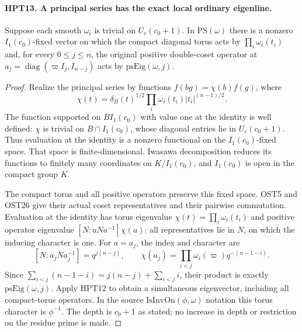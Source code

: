 \documentclass[11pt,a4paper]{article}
\numberwithin{equation}{section}
\theoremstyle{remark}\newtheorem{remark}[theorem]{Remark}
\begin{document}
\paragraph{HPT13. A principal series has the exact local ordinary eigenline.}
\label{claim:HPT13}
Suppose each smooth $\omega_i$ is trivial on $U_c(c_0+1)$.
In $\mathrm{PS}(\omega)$ there is a nonzero $I_1(c_0)$-fixed
vector on which the compact diagonal torus acts by
$\prod_i\omega_i(t_i)$ and, for every $0\leq j\leq n$,
the original positive double-coset operator at
$a_j=\operatorname{diag}(\varpi I_j,I_{n-j})$ acts by
$\mathrm{psEig}(\omega,j)$.
\begin{proof}
Realize the principal series by functions $f(bg)=\chi(b)f(g)$,
where
\[
       \chi(t)=\delta_B(t)^{1/2}\prod_i\omega_i(t_i)|t_i|^{(n-1)/2}.
\]
The function supported on $BI_1(c_0)$ with value one at the
identity is well defined: $\chi$ is trivial on $B\cap I_1(c_0)$,
whose diagonal entries lie in $U_c(c_0+1)$.  Thus evaluation at
the identity is a nonzero functional on the $I_1(c_0)$-fixed
space.  That space is finite-dimensional.  Iwasawa decomposition
reduces its functions to finitely many coordinates on
$K/I_1(c_0)$, and $I_1(c_0)$ is open in the compact group $K$.

The compact torus and all positive operators preserve this fixed
space.  OST5 and OST26 give their actual coset representatives
and their pairwise commutation.  Evaluation at the identity has
torus eigenvalue $\chi(t)=\prod_i\omega_i(t_i)$ and positive
operator eigenvalue $[N:aNa^{-1}]\chi(a)$: all representatives
lie in $N$, on which the inducing character is one.
For $a=a_j$, the index and character are
\[
 [N:a_jNa_j^{-1}]=q^{j(n-j)},\qquad
 \chi(a_j)=\prod_{i<j}\omega_i(\varpi)q^{-(n-1-i)}.
\]
Since $\sum_{i<j}(n-1-i)=j(n-j)+\sum_{i<j}i$, their product is
exactly $\mathrm{psEig}(\omega,j)$.  Apply HPT12 to obtain a
simultaneous eigenvector, including all compact-torus operators.
In the source $\mathrm{IsInvOn}(\phi,\omega)$ notation this
torus character is $\phi^{-1}$.  The depth is $c_0+1$ as stated;
no increase in depth or restriction on the residue prime is made.
\end{proof}

\end{document}
